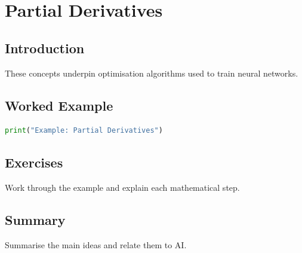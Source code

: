 \chapter{Partial Derivatives}
\label{chap:vol4-16}



\section{Introduction}
These concepts underpin optimisation algorithms used to train neural networks.

\section{Worked Example}
\begin{lstlisting}[language=Python]
print("Example: Partial Derivatives")
\end{lstlisting}

\section{Exercises}
\begin{exercise}
Work through the example and explain each mathematical step.
\end{exercise}

\section{Summary}
Summarise the main ideas and relate them to AI.
